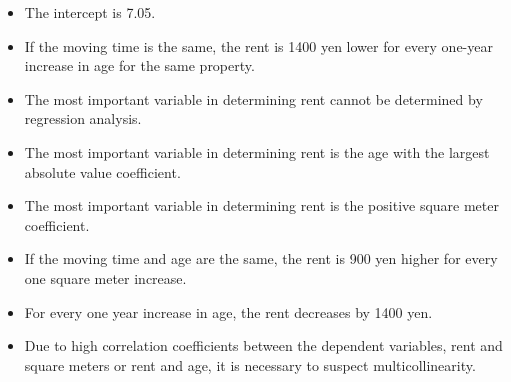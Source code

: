 \begin{itemize}
	\item The intercept is 7.05.
	\item If the moving time is the same, the rent is 1400 yen lower for every one-year increase in age for the same property.
	\item The most important variable in determining rent cannot be determined by regression analysis.
	\item The most important variable in determining rent is the age with the largest absolute value coefficient.
	\item The most important variable in determining rent is the positive square meter coefficient.
	\item If the moving time and age are the same, the rent is 900 yen higher for every one square meter increase.
	\item For every one year increase in age, the rent decreases by 1400 yen.
	\item Due to high correlation coefficients between the dependent variables, rent and square meters or rent and age, it is necessary to suspect multicollinearity.
\end{itemize}
